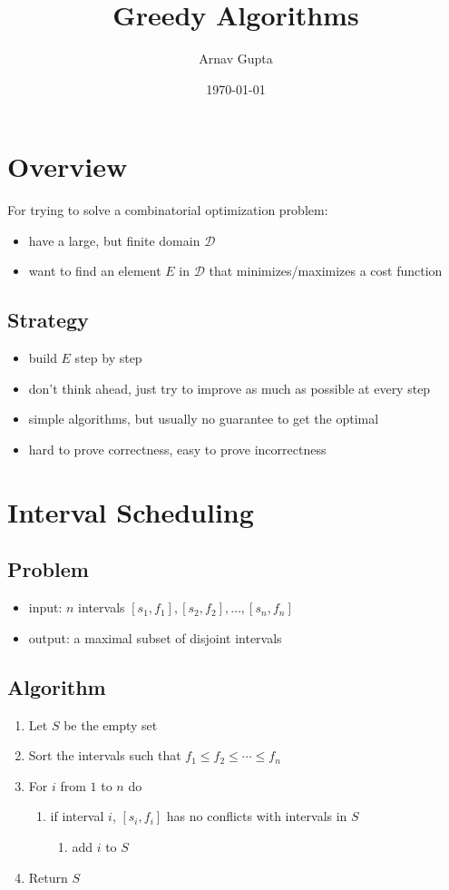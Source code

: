 \documentclass[11pt]{article}
\author{Arnav Gupta}
\date{\today}
\title{Greedy Algorithms}
\begin{document}
\maketitle
\tableofcontents

\section{Overview}
\label{sec:org16d4f40}
For trying to solve a combinatorial optimization problem:
\begin{itemize}
\item have a large, but finite domain \(\mathcal{D}\)
\item want to find an element \(E\) in \(\mathcal{D}\) that
minimizes/maximizes a cost function
\end{itemize}
\subsection{Strategy}
\label{sec:orgb0f3a75}
\begin{itemize}
\item build \(E\) step by step
\item don't think ahead, just try to improve as much as
possible at every step
\item simple algorithms, but usually no guarantee to get
the optimal
\item hard to prove correctness, easy to prove incorrectness
\end{itemize}
\section{Interval Scheduling}
\label{sec:orga0a2650}
\subsection{Problem}
\label{sec:orga98461a}
\begin{itemize}
\item input: \(n\) intervals \([s_{1}, f_{1}], [s_{2}, f_{2}], \dots, [s_{n}, f_{n}]\)
\item output: a maximal subset of disjoint intervals
\end{itemize}
\subsection{Algorithm}
\label{sec:org28a5c04}
\begin{enumerate}
\item Let \(S\) be the empty set
\item Sort the intervals such that \(f_{1} \le f_{2} \le \cdots \le f_{n}\)
\item For \(i\) from \(1\) to \(n\) do
\begin{enumerate}
\item if interval \(i\), \([s_{i}, f_{i}]\) has no conflicts with
intervals in \(S\)
\begin{enumerate}
\item add \(i\) to \(S\)
\end{enumerate}
\end{enumerate}
\item Return \(S\)
\end{enumerate}
\end{document}
